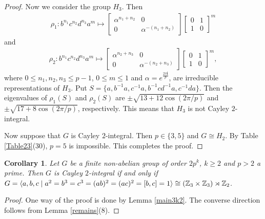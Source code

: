 \documentclass{amsart}
\newtheorem{core}[thm]{Corollary}
\def \leq {\leqslant}
\def \geq {\geqslant}
\begin{document}
\begin{proof}
Now we consider the group $H_3$. Then
\begin{eqnarray*}
	\rho_1: b^{n_1}c^{n_2}d^{n_3}a^m\mapsto \begin{bmatrix}
		\alpha^{n_1+n_2}&0\\
		0&\alpha^{-(n_1+n_2)}
	\end{bmatrix}\begin{bmatrix}
		0&1\\
		1&0
	\end{bmatrix}^m
\end{eqnarray*}
and 
\begin{eqnarray*}
	\rho_2: b^{n_1}c^{n_2}d^{n_3}a^m\mapsto \begin{bmatrix}
		\alpha^{n_2+n_3}&0\\
		0&\alpha^{-(n_2+n_3)}
	\end{bmatrix}\begin{bmatrix}
		0&1\\
		1&0
	\end{bmatrix}^m,
\end{eqnarray*}
where $0\leq n_1,n_2,n_3\leq p-1$, $0\leq m\leq 1$ and $\alpha=e^{\frac{2\pi\textbf{i}}{p}}$, are irreducible representations of $H_3$. Put $S=\{a,b^{-1}a,c^{-1}a,b^{-1}cd^{-1}a,c^{-1}da\}$. Then the eigenvalues of  $\rho_1(S)$ and $\rho_2(S)$ are $\pm\sqrt{13+12\cos(2\pi/p)}$ and $\pm\sqrt{17+8\cos(2\pi/p)}$, respectively. This means that $H_3$ is not Cayley $2$-integral.

Now suppose that $G$ is Cayley $2$-integral. Then $p\in\{3,5\}$ and $G\cong H_2$. By Table \ref{Table23}(30), $p=5$ is impossible. This completes the proof.
	\end{proof}
	

	\begin{core}\label{3k2}
		Let $G$ be a finite non-abelian  group of order $2p^k$, $k\geq 2$ and $p>2$ a prime. Then $G$ is Cayley $2$-integral if and only if $G=\langle a,b,c\mid a^2=b^3=c^3=(ab)^2=(ac)^2=[b,c]=1\rangle\cong (\Bbb Z_3\times\Bbb Z_3)\rtimes\Bbb Z_2$.
	\end{core}
	\begin{proof}
One way of the proof is done by Lemma \ref{main3k2}. The converse direction follows from Lemma \ref{remains}(8). 
		\end{proof}
	
	
\end{document}
